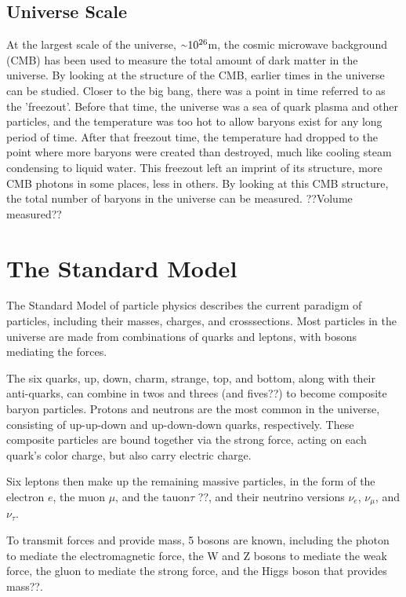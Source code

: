 \subsection{Universe Scale}
%
At the largest scale of the universe, $\nicetilde 10^{26}$m, the cosmic microwave background (CMB) has been used to measure the total amount of dark matter in the universe.
By looking at the structure of the CMB, earlier times in the universe can be studied.
Closer to the big bang, there was a point in time referred to as the 'freezout'.
Before that time, the universe was a sea of quark plasma and other particles, and the temperature was too hot to allow baryons exist for any long period of time.
After that freezout time, the temperature had dropped to the point where more baryons were created than destroyed, much like cooling steam condensing to liquid water.
This freezout left an imprint of its structure, more CMB photons in some places, less in others.
By looking at this CMB structure, the total number of baryons in the universe can be measured.
??Volume measured??


\section{The Standard Model}

The Standard Model of particle physics describes the current paradigm of particles, including their masses, charges, and crosssections.
Most particles in the universe are made from combinations of quarks and leptons, with bosons mediating the forces.

The six quarks, up, down, charm, strange, top, and bottom, along with their anti-quarks, can combine in twos and threes (and fives??) to become composite baryon particles.
Protons and neutrons are the most common in the universe, consisting of up-up-down and up-down-down quarks, respectively.
These composite particles are bound together via the strong force, acting on each quark's color charge, but also carry electric charge.

Six leptons then make up the remaining massive particles, in the form of the electron $e$, the muon $\mu$, and the tauon$\tau$ ??, and their neutrino versions $\nu_e$, $\nu_\mu$, and $\nu_\tau$.

To transmit forces and provide mass, 5 bosons are known, including the photon to mediate the electromagnetic force, the W and Z bosons to mediate the weak force, the gluon to mediate the strong force, and the Higgs boson that provides mass??.

